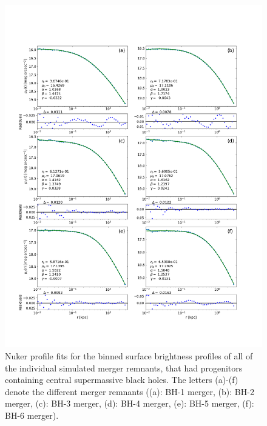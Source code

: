 \documentclass[english, twoside]{HYgradu}
\begin{document}
\begin{figure}
	\centering
	\includegraphics[width=\textwidth]{all_nuker_profiles.png}
	\caption{Nuker profile fits for the binned surface brightness profiles of all of the individual simulated merger remnants, that had progenitors containing central supermassive black holes. The letters (a)-(f) denote the different merger remnants ((a): BH-1 merger, (b): BH-2 merger, (c): BH-3 merger, (d): BH-4 merger, (e): BH-5 merger, (f): BH-6 merger).}
	\label{figure:all_nuker}
\end{figure}
\end{document}
